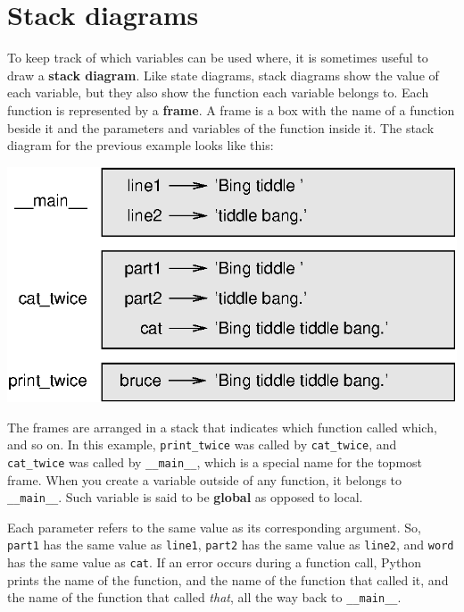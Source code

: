 

\section{Stack diagrams}
\label{stackdiagram}

To keep track of which variables can be used where, it is sometimes
useful to draw a {\bf stack diagram}.  Like state diagrams, stack
diagrams show the value of each variable, but they also show the
function each variable belongs to.
%
%
Each function is represented by a {\bf frame}.  A frame is a box
with the name of a function
beside it and the parameters and variables of the function inside it.
The stack diagram for the
previous example looks like this:

\beforefig
\centerline{\includegraphics{figs/stack.eps}}
\afterfig

The frames are arranged in a stack that indicates which function
called which, and so on.  In this example, \verb"print_twice"
was called by \verb"cat_twice", and \verb"cat_twice" was called by 
\verb"__main__", which is a special name for the topmost frame.  When
you create a variable outside of any function, it belongs to 
\verb"__main__". Such variable is said to be {\bf global} as opposed to local.

Each parameter refers to the same value as its corresponding
argument.  So, {\tt part1} has the same value as
{\tt line1}, {\tt part2} has the same value as {\tt line2},
and {\tt word} has the same value as {\tt cat}.
If an error occurs during a function call, Python prints the
name of the function, and the name of the function that called
it, and the name of the function that called {\em that}, all the
way back to \verb"__main__".

